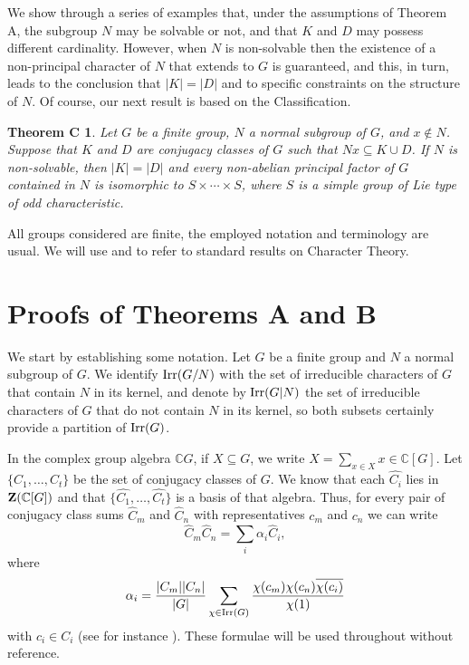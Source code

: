 \documentclass[12pt,leqno,a4paper]{amsart}
\newtheorem*{thmC}{Theorem C}
\numberwithin{equation}{section}
\begin{document}
We show  through a series of examples that, under the assumptions of Theorem A, the subgroup $N$ may be solvable or not, and that $K$ and $D$ may possess different cardinality.
 However, when $N$ is non-solvable then the existence of a non-principal character of $N$  that extends to $G$ is guaranteed, and this, in turn, leads to the conclusion that $|K|=|D|$ and to specific constraints on the structure of $N$. Of course, our next result is based on the Classification.






\begin{thmC} Let $G$ be a finite group, $N$  a normal subgroup of $G$, and $x\not \in N$. Suppose that $K$ and $D$ are conjugacy classes of $G$ such that  $Nx\subseteq K \cup D$. If $N$ is non-solvable, then $|K|=|D|$ and  every non-abelian principal factor of $G$  contained in $N$ is isomorphic to $S\times \cdots \times S$, where $S$ is a simple group of Lie type of odd characteristic.
 \end{thmC}





All groups considered are finite, the employed notation and terminology are usual. We will use \cite{Huppert} and \cite{Isaacs} to refer to standard results on Character Theory.










\section{Proofs of Theorems A and B}






 We start by establishing some notation. Let $G$ be a finite group and $N$ a normal subgroup of $G$. We identify ${\rm Irr}(G/N)$ with the set of irreducible characters of $G$ that contain $N$ in its kernel, and denote by ${\rm Irr}(G|N)$ the set of irreducible characters of $G$ that do not contain $N$ in its kernel, so both subsets certainly provide a partition of ${\rm Irr}(G)$.

 \medskip
 In the complex group algebra ${\mathbb C}G$, if $X\subseteq G$, we write $\widehat{X} =\sum_{x\in X} x\in {\mathbb C}[G]$. Let $\{C_1,\ldots, C_t\}$ be the set of conjugacy classes of $G$. We know that each $\widehat{C_i}$ lies in ${\bf Z}( {\mathbb C}[G])$ and  that  $\{\hat{C_1},\ldots, \hat{C_t}\}$  is a basis of that algebra. Thus,  for every pair of conjugacy class sums
$\widehat{C}_{m}$ and $\widehat{C}_{n}$ with representatives $c_{m}$ and $c_{n}$ we can write
$$
\widehat{C}_{m}\widehat{C}_{n}=\sum_{i}\alpha_{i}\widehat{C}_{i},
$$
where
$$
 \alpha_{i}=\frac{|C_{m}||C_{n}|}{|G|}\sum_{\chi\in {\rm Irr}(G)}\frac{\chi(c_{m})\chi(c_{n})\overline{\chi(c_{i})}}{\chi(1)}
$$
 with $c_{i}\in C_{i}$ (see for  instance \cite[ Theorem 4.6]{Huppert}).
 These formulae will be used throughout without reference.
\end{document}
